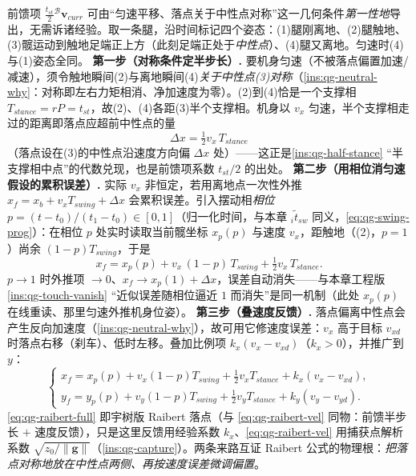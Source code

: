 \begin{derivation}\label{deriv:qg-raibert-firstprinciple}
前馈项 $\tfrac{t_{st}}{2}{}^{\mathcal{B}}\mathbf{v}_{curr}$ 可由“匀速平移、落点关于中性点对称”这一几何条件\emph{第一性地}导出\cite{unitree2023quadruped}，无需诉诸经验。取一条腿，沿时间标记四个姿态：(1)腿刚离地、(2)腿触地、(3)髋运动到触地足端正上方（此刻足端正处于\emph{中性点}）、(4)腿又离地。匀速时(4)与(1)姿态全同。
\textbf{第一步（对称条件定半步长）.} 要机身匀速（不被落点偏置加速/减速），须令触地瞬间(2)与离地瞬间(4)\emph{关于中性点(3)对称}（\cref{ins:qg-neutral-why}：对称即左右力矩相消、净加速度为零）。(2)到(4)恰是一个支撑相 $T_{stance}=rP=t_{st}$，故(2)、(4)各距(3)半个支撑相。机身以 $v_x$ 匀速，半个支撑相走过的距离即落点应超前中性点的量
\begin{equation}
  \Delta x=\tfrac12 v_x\,T_{stance}
  \label{eq:qg-raibert-halfstep}
\end{equation}
（落点设在(3)的中性点沿速度方向偏 $\Delta x$ 处）——这正是\cref{ins:qg-half-stance} “半支撑相中点”的代数兑现，也是前馈项系数 $t_{st}/2$ 的出处。
\textbf{第二步（用相位消匀速假设的累积误差）.} 实际 $v_x$ 非恒定，若用离地点一次性外推 $x_f=x_b+v_xT_{swing}+\Delta x$ 会累积误差。引入摆动相\emph{相位} $p=(t-t_0)/(t_1-t_0)\in[0,1]$（归一化时间，与本章 ${}_i\tilde t_{sw}$ 同义，\cref{eq:qg-swing-prog}）：在相位 $p$ 处实时读取当前髋坐标 $x_p(p)$ 与速度 $v_x$，距触地（(2)，$p=1$）尚余 $(1-p)T_{swing}$，于是
\begin{equation}
  x_f=x_p(p)+v_x\,(1-p)\,T_{swing}+\tfrac12 v_x\,T_{stance}.
  \label{eq:qg-raibert-phase}
\end{equation}
$p\to1$ 时外推项 $\to0$、$x_f\to x_p(1)+\Delta x$，误差自动消失——与本章工程版 \cref{ins:qg-touch-vanish} “近似误差随相位逼近 $1$ 而消失”是同一机制（此处 $x_p(p)$ 在线重读、那里匀速外推机身位姿）。
\textbf{第三步（叠速度反馈）.} 落点偏离中性点会产生反向加速度（\cref{ins:qg-neutral-why}），故可用它修速度误差：$v_x$ 高于目标 $v_{xd}$ 时落点右移（刹车）、低时左移。叠加比例项 $k_x(v_x-v_{xd})$（$k_x>0$），并推广到 $y$：
\begin{equation}
  \begin{cases}
  x_f=x_p(p)+v_x(1-p)T_{swing}+\tfrac12 v_x T_{stance}+k_x(v_x-v_{xd}),\\
  y_f=y_p(p)+v_y(1-p)T_{swing}+\tfrac12 v_y T_{stance}+k_y(v_y-v_{yd}).
  \end{cases}
  \label{eq:qg-raibert-full}
\end{equation}
\cref{eq:qg-raibert-full} 即宇树版 Raibert 落点（与 \cref{eq:qg-raibert-vel} 同物：前馈半步长 $+$ 速度反馈），只是这里反馈用经验系数 $k_x$、\cref{eq:qg-raibert-vel} 用捕获点解析系数 $\sqrt{z_0/\|\boldsymbol{g}\|}$（\cref{ins:qg-capture}）。两条来路互证 Raibert 公式的物理根：\emph{把落点对称地放在中性点两侧、再按速度误差微调偏置}。
\end{derivation}

